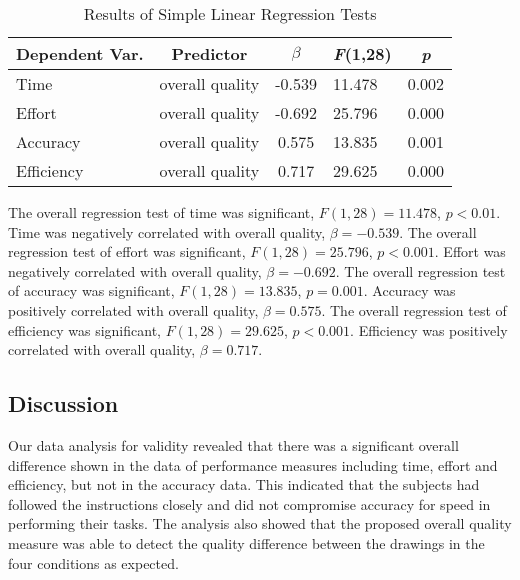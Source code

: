 \documentclass[conference,letterpaper]{IEEEtran}
\begin{document}
\begin{table*}[!t]

\renewcommand{\arraystretch}{1.3}
\caption{Results of Simple Linear Regression Tests}
\label{pred}
\centering
\begin{tabular}{l|c|c|l|c}

\hline
Dependent Var. & Predictor  & $\beta$ & \emph{F}(1,28) & \emph{p}\\
\hline
\hline
Time & overall quality & -0.539 & 11.478 & 0.002\\
Effort & overall quality & -0.692 & 25.796 & 0.000\\
Accuracy & overall quality & 0.575 & 13.835 & 0.001\\
Efficiency & overall quality & 0.717 & 29.625  & 0.000\\
\hline
\end{tabular}
\end{table*}

The overall regression test of time was significant, $F(1,28) = 11.478$, $p < 0.01$. Time was negatively correlated with overall quality, $\beta = -0.539$. The overall regression test of effort was significant, $F(1,28) = 25.796$, $p < 0.001$. Effort was negatively correlated with overall quality, $\beta = -0.692$. The overall regression test of accuracy was significant, $F(1,28) = 13.835$, $p = 0.001$. Accuracy was positively correlated with overall quality, $\beta = 0.575$. The overall regression test of efficiency was significant, $F(1,28) = 29.625$, $p < 0.001$. Efficiency was positively correlated with overall quality, $\beta = 0.717$.


\subsection{Discussion}


Our data analysis for validity revealed that there was a significant overall difference shown in the data of performance measures including time, effort and efficiency, but not in the accuracy data. This indicated that the subjects had followed the instructions closely and did not compromise accuracy for speed in performing their tasks. The analysis also showed that the proposed overall quality measure was able to detect the quality difference between the drawings in the four conditions as expected. 
\end{document}
